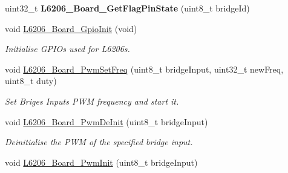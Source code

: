 \begin{DoxyCompactItemize}
\mbox{\label{group___motor_control___board___linked___functions_ga4b965ec9039e6d018c665e9bce3e7ae8}} 
uint32\+\_\+t {\bfseries L6206\+\_\+\+Board\+\_\+\+Get\+Flag\+Pin\+State} (uint8\+\_\+t bridge\+Id)
\item 
\mbox{\label{group___motor_control___board___linked___functions_gad1afef15b5cfa989ae0cedf94144dcbe}} 
void \mbox{\hyperlink{group___motor_control___board___linked___functions_gad1afef15b5cfa989ae0cedf94144dcbe}{L6206\+\_\+\+Board\+\_\+\+Gpio\+Init}} (void)
\begin{DoxyCompactList}\small\item\em Initialise G\+P\+I\+Os used for L6206s. \end{DoxyCompactList}\item 
\mbox{\label{group___motor_control___board___linked___functions_gafb87c92bb4518cbee4e12cb0c0b2742c}} 
void \mbox{\hyperlink{group___motor_control___board___linked___functions_gafb87c92bb4518cbee4e12cb0c0b2742c}{L6206\+\_\+\+Board\+\_\+\+Pwm\+Set\+Freq}} (uint8\+\_\+t bridge\+Input, uint32\+\_\+t new\+Freq, uint8\+\_\+t duty)
\begin{DoxyCompactList}\small\item\em Set Briges Inputs P\+WM frequency and start it. \end{DoxyCompactList}\item 
\mbox{\label{group___motor_control___board___linked___functions_gabe3a85fe41e2cabbae154e19506c7c39}} 
void \mbox{\hyperlink{group___motor_control___board___linked___functions_gabe3a85fe41e2cabbae154e19506c7c39}{L6206\+\_\+\+Board\+\_\+\+Pwm\+De\+Init}} (uint8\+\_\+t bridge\+Input)
\begin{DoxyCompactList}\small\item\em Deinitialise the P\+WM of the specified bridge input. \end{DoxyCompactList}\item 
\mbox{\label{group___motor_control___board___linked___functions_ga7a605957121921bc09640449cb941048}} 
void \mbox{\hyperlink{group___motor_control___board___linked___functions_ga7a605957121921bc09640449cb941048}{L6206\+\_\+\+Board\+\_\+\+Pwm\+Init}} (uint8\+\_\+t bridge\+Input)

\end{DoxyCompactItemize}

